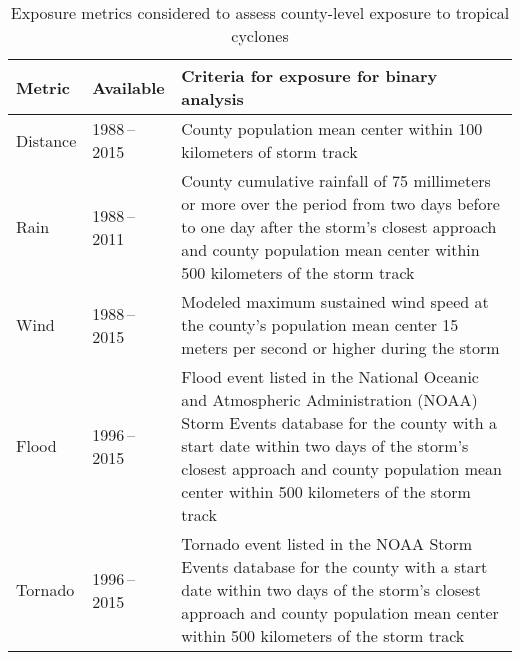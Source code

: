 \begin{table}%
\centering 
\caption{Exposure metrics considered to assess county-level exposure to 
tropical cyclones}
\begin{tabular}{p{0.9cm}p{2.5cm}p{9cm}} 
Metric & Available & Criteria for exposure for binary analysis \\ \midrule 
Distance & 1988\,--\,2015 & County population mean center within 100 kilometers of storm track \\ 
Rain & 1988\,--\,2011 & County cumulative rainfall of 75 millimeters or more over the period from two days before to one day after the storm's closest approach and county population mean center within 500 kilometers of the storm track \\ 
Wind & 1988\,--\,2015 & Modeled maximum sustained wind speed at the county's population mean center 15 meters per second or higher during the storm\\ 
Flood & 1996\,--\,2015 & Flood event listed in the National Oceanic and Atmospheric Administration (NOAA) Storm Events database for the county with a start date within two days of the storm's closest approach and county population mean center within 500 kilometers of the storm track \\
Tornado & 1996\,--\,2015 & Tornado event listed in the NOAA Storm Events database for the county with a start date within two days of the storm's closest approach and county population mean center within 500 kilometers of the storm track\\
\bottomrule 
\end{tabular} 
\label{tab:exposuremetrics} 
\end{table}
